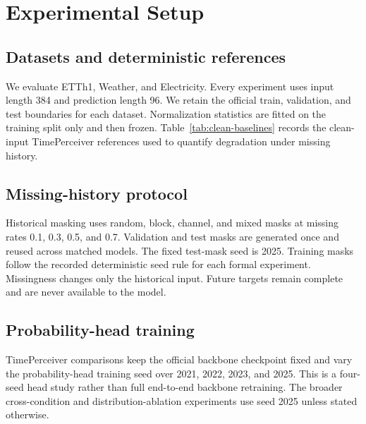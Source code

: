 \section{Experimental Setup}
\label{sec:setup}

\subsection{Datasets and deterministic references}

We evaluate ETTh1, Weather, and Electricity. Every experiment uses input length 384 and prediction length 96. We retain the official train, validation, and test boundaries for each dataset. Normalization statistics are fitted on the training split only and then frozen. Table~\ref{tab:clean-baselines} records the clean-input TimePerceiver references used to quantify degradation under missing history.

\begin{table}[t]
    \centering
    \caption{Clean-input TimePerceiver references. Metrics are reproduced under the project protocol with one official training seed per dataset.}
    \label{tab:clean-baselines}
    \small
    
\end{table}

\subsection{Missing-history protocol}

Historical masking uses random, block, channel, and mixed masks at missing rates 0.1, 0.3, 0.5, and 0.7. Validation and test masks are generated once and reused across matched models. The fixed test-mask seed is 2025. Training masks follow the recorded deterministic seed rule for each formal experiment. Missingness changes only the historical input. Future targets remain complete and are never available to the model.

\subsection{Probability-head training}

TimePerceiver comparisons keep the official backbone checkpoint fixed and vary the probability-head training seed over 2021, 2022, 2023, and 2025. This is a four-seed head study rather than full end-to-end backbone retraining. The broader cross-condition and distribution-ablation experiments use seed 2025 unless stated otherwise.

